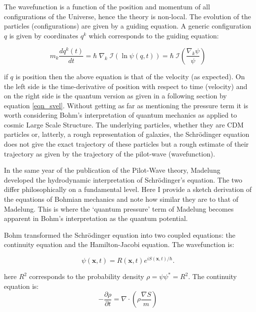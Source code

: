 The wavefunction is a function of the position and momentum of all configurations of the Universe, hence the theory is non-local. The evolution of the particles (configurations) are given by a guiding equation. A generic configuration $q$ is given by coordinates $q^k$ which corresponds to the guiding equation:

\begin{equation}
m_k\frac{d q^k(t)}{dt} = \hbar\;\nabla_k\;\mathcal{I}(\ln \psi(q,t)) = \hbar\; \mathcal{I}\left(\frac{\nabla_k \psi}{\psi} \right)
\end{equation}

\noindent if $q$ is position then the above equation is that of the velocity (as expected). On the left side is the time-derivative of position with respect to time (velocity) and on the right side is the quantum version as given in a following section by equation \ref{eqn_svel}. Without getting as far as mentioning the pressure term it is worth considering Bohm's interpretation of quantum mechanics as applied to cosmic Large Scale Structure. The underlying particles, whether they are CDM particles or, latterly, a rough representation of galaxies, the Schr\"odinger equation does not give the exact trajectory of these particles but a rough estimate of their trajectory as given by the trajectory of the pilot-wave (wavefunction).

In the same year of the publication of the Pilot-Wave theory, Madelung developed the hydrodynamic interpretation of Schr\"odinger's equation. The two differ philosophically on a fundamental level. Here I provide a sketch derivation of the equations of Bohmian mechanics and note how similar they are to that of Madelung. This is where the `quantum pressure' term of Madelung becomes apparent in Bohm's interpretation as the quantum potential.

Bohm transformed the Schr\"odinger equation into two coupled equations: the continuity equation and the Hamilton-Jacobi equation. The wavefunction is:

\begin{equation}
\psi(\mathbf{x},t) = R(\mathbf{x},t)e^{i S(\mathbf{x},t) / \hbar}. 
\end{equation}

\noindent here $R^2$ corresponds to the probability density $\rho = \psi\psi^* = R^2$. The continuity equation is:
\begin{equation}
 -\frac{\partial \rho}{\partial t} = \nabla \cdot \left(\rho \frac{\nabla S}{m}\right)
\end{equation}

